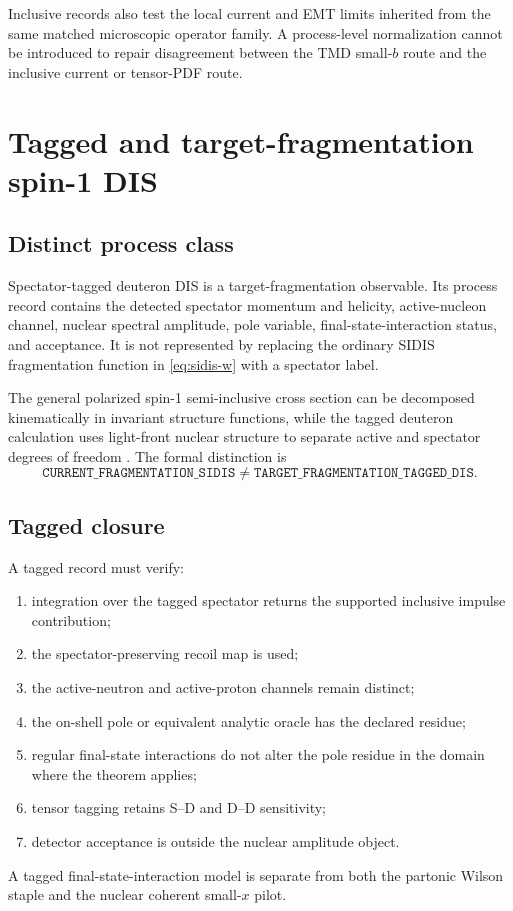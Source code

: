 \documentclass[11pt]{article}
\begin{document}
Inclusive records also test the local current and EMT limits inherited from the same matched microscopic operator family.  A process-level normalization cannot be introduced to repair disagreement between the TMD small-\(b\) route and the inclusive current or tensor-PDF route.

\section{Tagged and target-fragmentation spin-1 DIS}
\label{sec:tagged}

\subsection{Distinct process class}

Spectator-tagged deuteron DIS is a target-fragmentation observable.  Its process record contains the detected spectator momentum and helicity, active-nucleon channel, nuclear spectral amplitude, pole variable, final-state-interaction status, and acceptance.  It is not represented by replacing the ordinary SIDIS fragmentation function in \cref{eq:sidis-w} with a spectator label.

The general polarized spin-1 semi-inclusive cross section can be decomposed kinematically in invariant structure functions, while the tagged deuteron calculation uses light-front nuclear structure to separate active and spectator degrees of freedom \cite{CosynWeissI2026,CosynWeissII2026}.  The formal distinction is
\begin{equation}
 \texttt{CURRENT\_FRAGMENTATION\_SIDIS}
 \neq
 \texttt{TARGET\_FRAGMENTATION\_TAGGED\_DIS}.
 \label{eq:current-target-distinction}
\end{equation}

\subsection{Tagged closure}

A tagged record must verify:
\begin{enumerate}
\item integration over the tagged spectator returns the supported inclusive impulse contribution;
\item the spectator-preserving recoil map is used;
\item the active-neutron and active-proton channels remain distinct;
\item the on-shell pole or equivalent analytic oracle has the declared residue;
\item regular final-state interactions do not alter the pole residue in the domain where the theorem applies;
\item tensor tagging retains S--D and D--D sensitivity;
\item detector acceptance is outside the nuclear amplitude object.
\end{enumerate}
A tagged final-state-interaction model is separate from both the partonic Wilson staple and the nuclear coherent small-\(x\) pilot.
\end{document}
